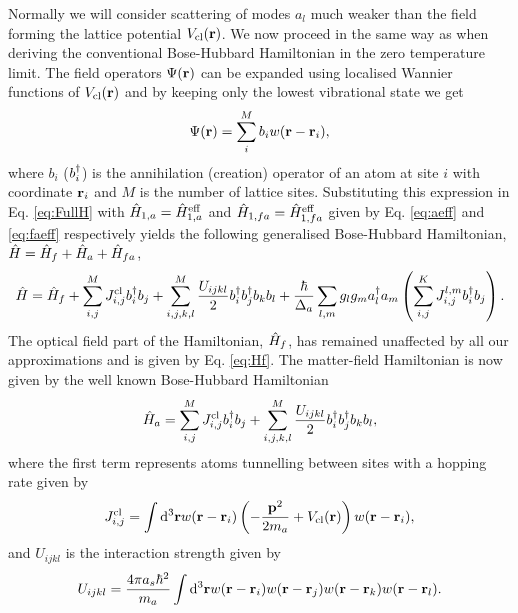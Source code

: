 Normally we will consider scattering of modes $a_l$ much weaker than
the field forming the lattice potential $V_\mathrm{cl}(\mathbf{r})$. We now
proceed in the same way as when deriving the conventional Bose-Hubbard
Hamiltonian in the zero temperature limit. The field operators
$\Psi(\mathbf{r})$ can be expanded using localised Wannier functions of
$V_\mathrm{cl}(\mathbf{r})$ and by keeping only the lowest vibrational
state we get
\begin{equation}
  \Psi(\mathbf{r}) = \sum_i^M b_i w(\mathbf{r} - \mathbf{r}_i),
\end{equation} 
where $b_i$ ($b^\dagger_i$) is the annihilation (creation) operator of an
atom at site $i$ with coordinate $\mathbf{r}_i$ and $M$ is the number of
lattice sites. Substituting this expression in Eq. \eqref{eq:FullH}
with $\hat{H}_{1,a} = \hat{H}_{1,a}^\mathrm{eff}$ and
$\hat{H}_{1,fa} = \hat{H}_{1,fa}^\mathrm{eff}$ given by Eq. \eqref{eq:aeff} and
\eqref{eq:faeff} respectively yields the following generalised
Bose-Hubbard Hamiltonian, $\hat{H} = \hat{H}_f + \hat{H}_a + \hat{H}_{fa}$, 
\begin{equation}
  \hat{H} = \hat{H}_f + \sum_{i,j}^M J^\mathrm{cl}_{i,j} b^\dagger_i b_j + 
  \sum_{i,j,k,l}^M \frac{U_{ijkl}}{2} b^\dagger_i b^\dagger_j b_k b_l + 
  \frac{\hbar}{\Delta_a} \sum_{l,m} g_l g_m a^\dagger_l a_m 
  \left( \sum_{i,j}^K J^{l,m}_{i,j} b^\dagger_i b_j \right).
\end{equation}
The optical field part of the Hamiltonian, $\hat{H}_f$, has remained
unaffected by all our approximations and is given by
Eq. \eqref{eq:Hf}. The matter-field Hamiltonian is now given by the
well known Bose-Hubbard Hamiltonian
\begin{equation}
  \hat{H}_a = \sum_{i,j}^M J^\mathrm{cl}_{i,j} b^\dagger_i b_j + 
  \sum_{i,j,k,l}^M \frac{U_{ijkl}}{2} b^\dagger_i b^\dagger_j b_k b_l,
\end{equation}
where the first term represents atoms tunnelling between sites with a
hopping rate given by
\begin{equation}
  J^\mathrm{cl}_{i,j} = \int \mathrm{d}^3 \mathbf{r} w (\mathbf{r} - \mathbf{r}_i ) 
  \left( -\frac{\mathbf{p}^2}{2 m_a} + V_\mathrm{cl}(\mathbf{r}) \right) w(\mathbf{r}
  - \mathbf{r}_i),
\end{equation}
and $U_{ijkl}$ is the interaction strength given by
\begin{equation}
  U_{ijkl} = \frac{4 \pi a_s \hbar^2}{m_a} \int \mathrm{d}^3 \mathbf{r} 
  w(\mathbf{r} - \mathbf{r}_i) w(\mathbf{r} - \mathbf{r}_j) w(\mathbf{r} - \mathbf{r}_k) w(\mathbf{r} - \mathbf{r}_l).
\end{equation}

